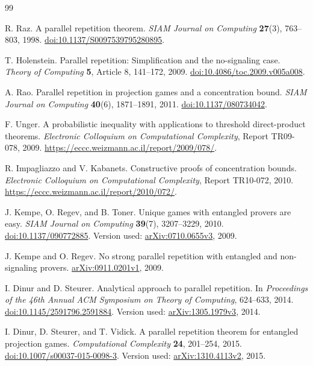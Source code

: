 \documentclass[11pt,reqno]{amsart}
\numberwithin{equation}{section}
\theoremstyle{definition}
\theoremstyle{remark}
\begin{document}
\begin{thebibliography}{99}

R. Raz.
A parallel repetition theorem.
\emph{SIAM Journal on Computing} \textbf{27}(3), 763--803, 1998.
\href{https://doi.org/10.1137/S0097539795280895}{doi:10.1137/S0097539795280895}.

T. Holenstein.
Parallel repetition: Simplification and the no-signaling case.
\emph{Theory of Computing} \textbf{5}, Article 8, 141--172, 2009.
\href{https://doi.org/10.4086/toc.2009.v005a008}{doi:10.4086/toc.2009.v005a008}.

A. Rao.
Parallel repetition in projection games and a concentration bound.
\emph{SIAM Journal on Computing} \textbf{40}(6), 1871--1891, 2011.
\href{https://doi.org/10.1137/080734042}{doi:10.1137/080734042}.

F. Unger.
A probabilistic inequality with applications to threshold direct-product theorems.
\emph{Electronic Colloquium on Computational Complexity}, Report TR09-078, 2009.
\url{https://eccc.weizmann.ac.il/report/2009/078/}.

R. Impagliazzo and V. Kabanets.
Constructive proofs of concentration bounds.
\emph{Electronic Colloquium on Computational Complexity}, Report TR10-072, 2010.
\url{https://eccc.weizmann.ac.il/report/2010/072/}.

J. Kempe, O. Regev, and B. Toner.
Unique games with entangled provers are easy.
\emph{SIAM Journal on Computing} \textbf{39}(7), 3207--3229, 2010.
\href{https://doi.org/10.1137/090772885}{doi:10.1137/090772885}.
Version used: \href{https://arxiv.org/abs/0710.0655v3}{arXiv:0710.0655v3}, 2009.

J. Kempe and O. Regev.
No strong parallel repetition with entangled and non-signaling provers.
\href{https://arxiv.org/abs/0911.0201v1}{arXiv:0911.0201v1}, 2009.

I. Dinur and D. Steurer.
Analytical approach to parallel repetition.
In \emph{Proceedings of the 46th Annual ACM Symposium on Theory of Computing},
624--633, 2014.
\href{https://doi.org/10.1145/2591796.2591884}{doi:10.1145/2591796.2591884}.
Version used: \href{https://arxiv.org/abs/1305.1979v3}{arXiv:1305.1979v3}, 2014.

I. Dinur, D. Steurer, and T. Vidick.
A parallel repetition theorem for entangled projection games.
\emph{Computational Complexity} \textbf{24}, 201--254, 2015.
\href{https://doi.org/10.1007/s00037-015-0098-3}{doi:10.1007/s00037-015-0098-3}.
Version used: \href{https://arxiv.org/abs/1310.4113v2}{arXiv:1310.4113v2}, 2015.


\end{thebibliography}
\end{document}
